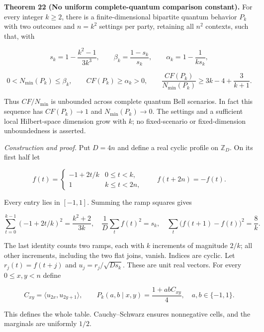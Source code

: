 \documentclass[
]{article}
\begin{document}
\textbf{Theorem 22 (No uniform complete-quantum comparison constant).} For every
integer \(k\ge2\), there is a finite-dimensional bipartite quantum behavior \(P_k\)
with two outcomes and \(n=k^2\) settings per party, retaining all \(n^2\) contexts,
such that, with

\[
s_k=1-\frac{k^2-1}{3k^3},\qquad
\beta_k=\frac{1-s_k}{s_k},\qquad
\alpha_k=1-\frac{1}{ks_k},
\]

\[
0<N_{\min}(P_k)\le\beta_k,\qquad
CF(P_k)\ge\alpha_k>0,\qquad
\frac{CF(P_k)}{N_{\min}(P_k)}\ge
3k-4+\frac{3}{k+1}.\tag{44}
\]

Thus \(CF/N_{\min}\) is unbounded across complete quantum Bell scenarios.
In fact this sequence has \(CF(P_k)\to1\) and \(N_{\min}(P_k)\to0\).
The settings and a sufficient local Hilbert-space dimension grow with \(k\);
no fixed-scenario or fixed-dimension unboundedness is asserted.

\emph{Construction and proof.} Put \(D=4n\) and define a real cyclic profile on
\(\mathbb Z_D\). On its first half let

\[
f(t)=\begin{cases}-1+2t/k&0\le t<k,\\1&k\le t<2n,\end{cases}
\qquad f(t+2n)=-f(t).
\tag{45}
\]

Every entry lies in \([-1,1]\). Summing the ramp squares gives

\[
\sum_{t=0}^{k-1}(-1+2t/k)^2=\frac{k^2+2}{3k},
\quad \frac1D\sum_t f(t)^2=s_k,
\quad \sum_t\bigl(f(t+1)-f(t)\bigr)^2=\frac8k.
\tag{46}
\]

The last identity counts two ramps, each with \(k\) increments of magnitude
\(2/k\); all other increments, including the two flat joins, vanish. Indices
are cyclic. Let \(r_j(t)=f(t+j)\) and \(u_j=r_j/\sqrt{Ds_k}\). These are unit
real vectors. For every \(0\le x,y<n\) define

\[
C_{xy}=\langle u_{2x},u_{2y+1}\rangle,\qquad
P_k(a,b\mid x,y)=\frac{1+abC_{xy}}4,
\quad a,b\in\{-1,1\}.
\tag{47}
\]

This defines the whole table. Cauchy--Schwarz ensures nonnegative cells,
and the marginals are uniformly \(1/2\).
\end{document}

